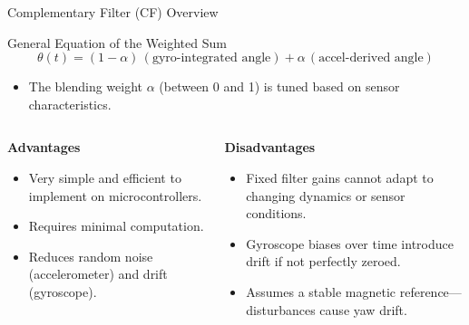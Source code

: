 \documentclass[aspectratio=169,xcolor=dvipsnames]{beamer}
\begin{document}
\begin{frame}{Complementary Filter (CF) Overview}
\small

\begin{block}{General Equation of the Weighted Sum}
  \[
    \theta(t) = (1 - \alpha)\,(\text{gyro-integrated angle}) + \alpha\,(\text{accel-derived angle})
  \]
\end{block}

\begin{itemize}
  \item The blending weight \textbf{$\alpha$} (between 0 and 1) is tuned based on sensor characteristics. 
\end{itemize}

\vspace{0.5em}

\begin{columns}[T,onlytextwidth]
  \begin{column}{0.48\textwidth}
    \begin{block}{\textbf{Advantages}}
      \begin{itemize}
        \item Very simple and efficient to implement on microcontrollers.
        \item Requires minimal computation.
        \item Reduces random noise (accelerometer) and drift (gyroscope)\cite{valentiCF2015}.
      \end{itemize}
    \end{block}
  \end{column}

  \begin{column}{0.48\textwidth}
    \begin{block}{\textbf{Disadvantages}}
      \begin{itemize}
        \item Fixed filter gains cannot adapt to changing dynamics or sensor conditions.
        \item Gyroscope biases over time introduce drift if not perfectly zeroed.
        \item Assumes a stable magnetic reference—disturbances cause yaw drift.
      \end{itemize}
    \end{block}
  \end{column}
\end{columns}

\end{frame}
\end{document}
